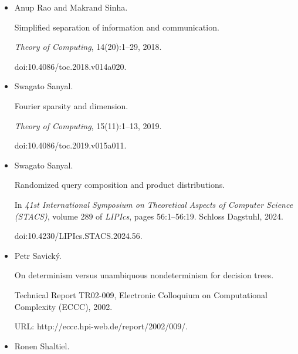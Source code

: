 \begin{itemize}
In \emph{2014 IEEE Conference on Computational Complexity (CCC)},
pages 144–154. IEEE Computer Society, 2014.


doi:10.1109/CCC.2014.22.





\item[] 
[47]

Anup Rao and Makrand Sinha.


Simplified separation of information and communication.


\emph{Theory of Computing}, 14(20):1–29, 2018.


doi:10.4086/toc.2018.v014a020.





\item[] 
[48]

Swagato Sanyal.


Fourier sparsity and dimension.


\emph{Theory of Computing}, 15(11):1–13, 2019.


doi:10.4086/toc.2019.v015a011.





\item[] 
[49]

Swagato Sanyal.


Randomized query composition and product distributions.


In \emph{41st International Symposium on Theoretical Aspects of
Computer Science (STACS)}, volume 289 of \emph{LIPIcs}, pages 56:1–56:19.
Schloss Dagstuhl, 2024.


doi:10.4230/LIPIcs.STACS.2024.56.





\item[] 
[50]

Petr Savický.


On determinism versus unambiquous nondeterminism for decision trees.


Technical Report TR02-009, Electronic Colloquium on Computational
Complexity (ECCC), 2002.


URL: http://eccc.hpi-web.de/report/2002/009/.





\item[] 
[51]

Ronen Shaltiel.



\end{itemize}
